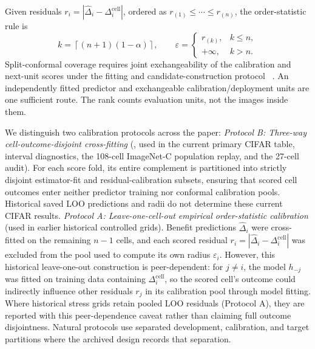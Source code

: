 Given residuals $r_i=|\widehat\Delta_i-\Delta_i^{\mathrm{cell}}|$, ordered as
$r_{(1)}\le\cdots\le r_{(n)}$, the order-statistic rule is
\begin{equation}
 k=\left\lceil(n+1)(1-\alpha)\right\rceil,\qquad
 \varepsilon=
 \begin{cases}
 r_{(k)},&k\le n,\\
 +\infty,&k>n.
 \end{cases}
 \label{eq:compact-rank}
\end{equation}
Split-conformal coverage requires joint exchangeability of the calibration and next-unit scores
under the fitting and candidate-construction protocol
~\cite{tibshirani2019conformal,barber2023beyond}. An independently fitted predictor and exchangeable
calibration/deployment units are one sufficient route. The rank counts evaluation units, not the
images inside them.

We distinguish two calibration protocols across the paper:
\emph{Protocol B: Three-way cell-outcome-disjoint cross-fitting} (, used in the current primary CIFAR table, interval diagnostics, the 108-cell ImageNet-C population replay, and the  27-cell audit). For each score fold, its entire complement is partitioned into strictly disjoint estimator-fit and residual-calibration subsets, ensuring that scored cell outcomes enter neither predictor training nor conformal calibration pools. Historical saved LOO predictions and radii do not determine these current CIFAR results.
\emph{Protocol A: Leave-one-cell-out empirical order-statistic calibration} (used in earlier historical controlled grids). Benefit predictions $\widehat\Delta_i$ were cross-fitted on the remaining $n-1$ cells, and each scored residual $r_i = |\widehat\Delta_i - \Delta_i^{\mathrm{cell}}|$ was excluded from the pool used to compute its own radius $\varepsilon_i$. However, this historical leave-one-out construction is peer-dependent: for $j \neq i$, the model $h_{-j}$ was fitted on training data containing $\Delta_i^{\mathrm{cell}}$, so the scored cell's outcome could indirectly influence other residuals $r_j$ in its calibration pool through model fitting.
Where historical stress grids retain pooled LOO residuals (Protocol A), they are reported with this peer-dependence caveat rather than claiming full outcome disjointness. Natural protocols use separated development, calibration, and target partitions where the archived design records that separation.

